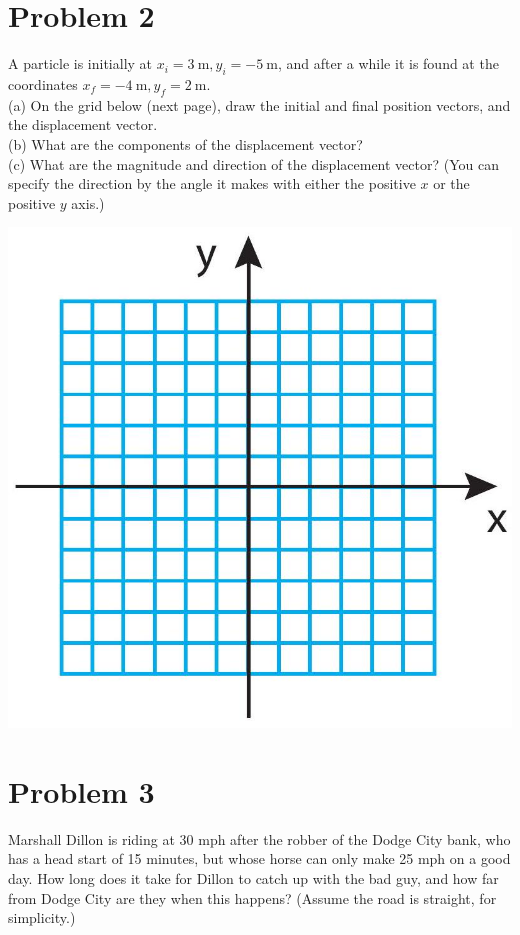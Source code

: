 \documentclass[10pt]{article}
\begin{document}
\section*{Problem 2}
A particle is initially at $x_{i}=3 \mathrm{~m}, y_{i}=-5 \mathrm{~m}$, and after a while it is found at the coordinates $x_{f}=-4 \mathrm{~m}, y_{f}=2 \mathrm{~m}$.\\
(a) On the grid below (next page), draw the initial and final position vectors, and the displacement vector.\\
(b) What are the components of the displacement vector?\\
(c) What are the magnitude and direction of the displacement vector? (You can specify the direction by the angle it makes with either the positive $x$ or the positive $y$ axis.)

\begin{center}
\includegraphics[max width=\textwidth]{2024_09_14_9969b06773f10b6936e8g-046}
\end{center}

\section*{Problem 3}
Marshall Dillon is riding at 30 mph after the robber of the Dodge City bank, who has a head start of 15 minutes, but whose horse can only make 25 mph on a good day. How long does it take for Dillon to catch up with the bad guy, and how far from Dodge City are they when this happens? (Assume the road is straight, for simplicity.)
\end{document}
